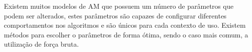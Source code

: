 Existem muitos modelos de AM que possuem um número de parâmetros que podem ser alterados, estes parâmetros são capazes de configurar diferentes comportamentos nos algoritmos e são únicos para cada contexto de uso. Existem métodos para escolher o parâmetros de forma ótima, sendo o caso mais comum, a utilização de força bruta. 









































